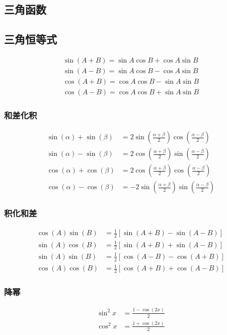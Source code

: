 \begin{center}\section{ 三角函数}\label{chapter_trigonometric_function}\end{center}
\subsection{三角恒等式}
\begin{align}
    \sin(A+B)= \sin A\cos B+\cos A\sin B\\
    \sin(A-B)= \sin A\cos B-\cos A\sin B\\
    \cos(A+B)= \cos A\cos B-\sin A\sin B\\
    \cos(A-B)= \cos A\cos B+\sin A\sin B
\end{align}
\subsubsection{和差化积}
\begin{align}
    \sin(\alpha)+\sin(\beta)&=2\sin\left(\frac{\alpha+\beta}{2}\right)\cos\left(\frac{\alpha-\beta}{2}\right)\\
    \sin(\alpha)-\sin(\beta)&=2\cos \left(\frac{\alpha+\beta}{2}\right)\sin\left(\frac{\alpha-\beta}{2}\right)\\
    \cos(\alpha)+\cos(\beta)&=2\cos \left(\frac{\alpha+\beta}{2}\right)\cos\left(\frac{\alpha-\beta}{2}\right)\\
    \cos(\alpha)-\cos(\beta)&=-2\sin \left(\frac{\alpha+\beta}{2}\right)\sin\left(\frac{\alpha-\beta}{2}\right)
\end{align}
\subsubsection{积化和差}
\begin{align}
    \cos(A)\sin(B)&=\frac{1}{2}\left[\sin(A+B)-\sin(A-B)\right]\\
    \sin(A)\cos(B)&=\frac{1}{2}\left[\sin(A+B)+\sin(A-B)\right]\\
    \sin(A)\sin(B)&=\frac{1}{2}\left[\cos(A-B)-\cos(A+B)\right]\\
    \cos(A)\cos(B)&=\frac{1}{2}\left[\cos(A+B)+\cos(A-B)\right]
\end{align}
\subsubsection{降幂}
\begin{align}
    \sin^2x&=\frac{1-\cos(2x)}{2}\\
    \cos^2x&=\frac{1+\cos(2x)}{2}
\end{align}
